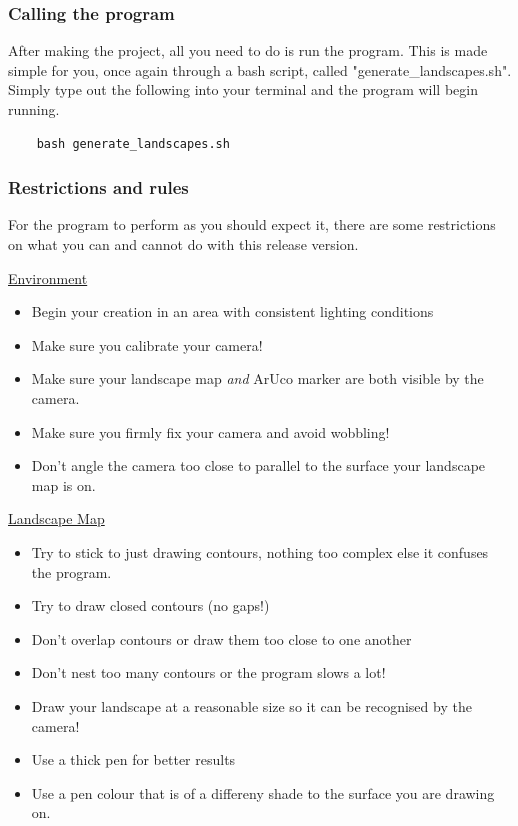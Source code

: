 \documentclass[11pt]{article}
\begin{document}
\subsubsection*{Calling the program}
After making the project, all you need to do is run the program. This
is made simple for you, once again through a bash script, called
"generate\_landscapes.sh". Simply type out the following into
your terminal and the program will begin running.

\begin{verbatim}
	bash generate_landscapes.sh
\end{verbatim}

\subsubsection*{Restrictions and rules}
For the program to perform as you should expect it, there are some 
restrictions on what you can and cannot do with this release version.

\underline{Environment}\\
\begin{itemize}
	\item Begin your creation in an area with consistent lighting conditions
	\item Make sure you calibrate your camera!
	\item Make sure your landscape map \textit{and} ArUco marker are both
			visible by the camera.
	\item Make sure you firmly fix your camera and avoid wobbling!
	\item Don't angle the camera too close to parallel to the surface
			your landscape map is on.
\end{itemize}

\underline{Landscape Map}\\
\begin{itemize}
	\item Try to stick to just drawing contours, nothing too complex else
			it confuses the program.
	\item Try to draw closed contours (no gaps!)
	\item Don't overlap contours or draw them too close to one another
	\item Don't nest too many contours or the program slows a lot!
	\item Draw your landscape at a reasonable size so it can be
			recognised by the camera!
	\item Use a thick pen for better results
	\item Use a pen colour that is of a differeny shade to the surface
			you are drawing on.
\end{itemize}
\end{document}
